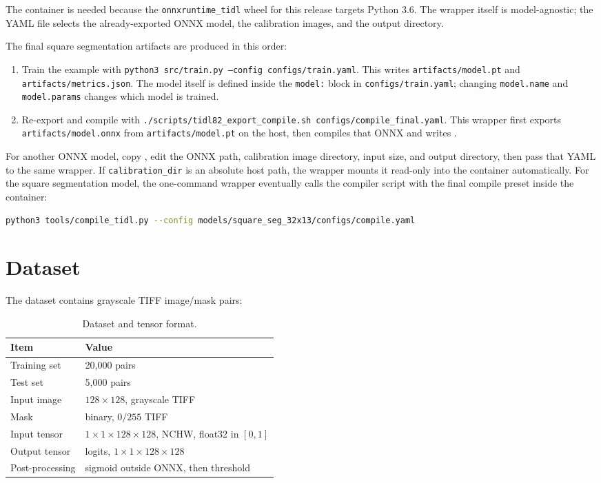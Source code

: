 \documentclass[11pt,a4paper]{article}
\begin{document}
The container is needed because the \texttt{onnxruntime\_tidl} wheel for this release targets Python 3.6.  The wrapper itself is model-agnostic; the YAML file selects the already-exported ONNX model, the calibration images, and the output directory.

The final square segmentation artifacts are produced in this order:

\begin{enumerate}
\item Train the example with \texttt{python3 src/train.py --config configs/train.yaml}.  This writes \texttt{artifacts/model.pt} and \texttt{artifacts/metrics.json}.  The model itself is defined inside the \texttt{model:} block in \texttt{configs/train.yaml}; changing \texttt{model.name} and \texttt{model.params} changes which model is trained.
\item Re-export and compile with \texttt{./scripts/tidl82\_export\_compile.sh configs/compile\_final.yaml}.  This wrapper first exports \texttt{artifacts/model.onnx} from \texttt{artifacts/model.pt} on the host, then compiles that ONNX and writes .
\end{enumerate}

For another ONNX model, copy , edit the ONNX path, calibration image directory, input size, and output directory, then pass that YAML to the same wrapper.  If \texttt{calibration\_dir} is an absolute host path, the wrapper mounts it read-only into the container automatically.  For the square segmentation model, the one-command wrapper eventually calls the compiler script with the final compile preset inside the container:

\begin{lstlisting}[language=bash]
python3 tools/compile_tidl.py --config models/square_seg_32x13/configs/compile.yaml
\end{lstlisting}

\section{Dataset}

The dataset contains grayscale TIFF image/mask pairs:

\begin{table}[H]
\centering
\caption{Dataset and tensor format.}
\begin{tabular}{ll}
\toprule
Item & Value \\
\midrule
Training set & 20,000 pairs \\
Test set & 5,000 pairs \\
Input image & $128\times128$, grayscale TIFF \\
Mask & binary, $0/255$ TIFF \\
Input tensor & $1\times1\times128\times128$, NCHW, float32 in $[0,1]$ \\
Output tensor & logits, $1\times1\times128\times128$ \\
Post-processing & sigmoid outside ONNX, then threshold \\
\bottomrule
\end{tabular}
\end{table}
\end{document}
